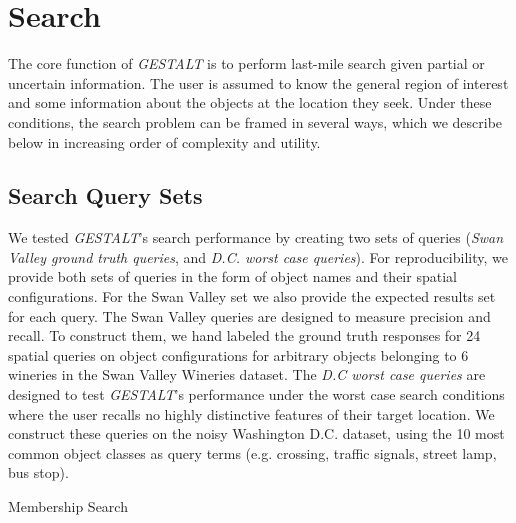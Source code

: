 \section{Search}
\label{section:search}

The core function of \textit{GESTALT} is to perform last-mile search given partial or uncertain information.
The user is assumed to know the general region of interest and some information about the objects at the location they seek.
Under these conditions, the search problem can be framed in several ways, which we describe below in increasing order of complexity and utility.

\subsection{Search Query Sets}
We tested \emph{GESTALT}'s search performance by creating two sets of queries (\textit{Swan Valley ground truth queries}, and \textit{D.C. worst case queries}). 
For reproducibility, we provide both sets of queries in the form of object names and their spatial configurations. 
For the Swan Valley set we also provide the expected results set for each query. 
The Swan Valley queries are designed to measure precision and recall. 
To construct them, we hand labeled the ground truth responses for 24 spatial queries on object configurations for arbitrary objects belonging to 6 wineries in the Swan Valley Wineries dataset. 
The \textit{D.C worst case queries} are designed to test \emph{GESTALT}'s performance under the worst case search conditions where the user recalls no highly distinctive features of their target location.
We construct these queries on the noisy Washington D.C. dataset, using the 10 most common object classes as query terms (e.g. crossing, traffic signals, street lamp, bus stop).

\begin{algorithm}
    \caption{Membership Search}\label{alg:search}
    \begin{algorithmic}
        \State{- - - - -}
            \EndFor
            \EndProcedure
    \end{algorithmic}
\end{algorithm}

